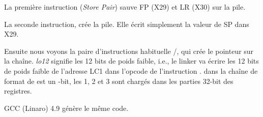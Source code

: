 




La première instruction  (\emph{Store Pair}) sauve \ac{FP} (X29) et \ac{LR} (X30) sur la pile.

La seconde instruction,  crée la pile.
Elle écrit simplement la valeur de \ac{SP} dans X29.

Ensuite nous voyons la paire d'instructions habituelle /\ADD, qui crée
le pointeur sur la chaîne.
\emph{lo12} signifie les 12 bits de poids faible, i.e., le linker va écrire les 12 bits
de poids faible de l'adresse LC1 dans l'opcode de l'instruction \ADD.
 dans la chaîne de format de \printf est un -bit, les 1, 2 et
3 sont chargés dans les parties 32-bit des registres.

GCC (Linaro) 4.9 \Optimizing génère le même code.

